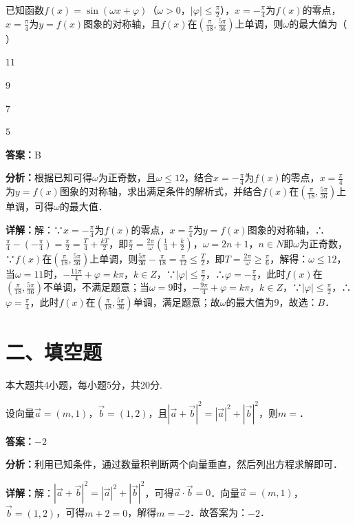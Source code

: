 \begin{question}[points=5]
已知函数$f(x)=\sin(\omega x+\varphi)$（$\omega>0$，$|\varphi|\le\frac{\pi}{2}$），$x=-\frac{\pi}{4}$为$f(x)$的零点，$x=\frac{\pi}{4}$为$y=f(x)$图象的对称轴，且$f(x)$在$(\frac{\pi}{18},\frac{5\pi}{36})$上单调，则$\omega$的最大值为（ ）
\begin{choices}
  \item $11$
  \item $9$
  \item $7$
  \item $5$
\end{choices}
\begin{solution}
\textbf{答案：}B

\textbf{分析：}根据已知可得$\omega$为正奇数，且$\omega\le12$，结合$x=-\frac{\pi}{4}$为$f(x)$的零点，$x=\frac{\pi}{4}$为$y=f(x)$图象的对称轴，求出满足条件的解析式，并结合$f(x)$在$(\frac{\pi}{18},\frac{5\pi}{36})$上单调，可得$\omega$的最大值．

\textbf{详解：}解：∵$x=-\frac{\pi}{4}$为$f(x)$的零点，$x=\frac{\pi}{4}$为$y=f(x)$图象的对称轴，∴$\frac{\pi}{4}-(-\frac{\pi}{4})=\frac{\pi}{2}=\frac{T}{4}+\frac{kT}{2}$，即$\frac{\pi}{2}=\frac{2\pi}{\omega}(\frac{1}{4}+\frac{k}{2})$，$\omega=2n+1$，$n\in N$即$\omega$为正奇数，∵$f(x)$在$(\frac{\pi}{18},\frac{5\pi}{36})$上单调，则$\frac{5\pi}{36}-\frac{\pi}{18}=\frac{\pi}{12}\le\frac{T}{2}$，即$T=\frac{2\pi}{\omega}\ge\frac{\pi}{6}$，解得：$\omega\le12$，当$\omega=11$时，$-\frac{11\pi}{4}+\varphi=k\pi$，$k\in Z$，∵$|\varphi|\le\frac{\pi}{2}$，∴$\varphi=-\frac{\pi}{4}$，此时$f(x)$在$(\frac{\pi}{18},\frac{5\pi}{36})$不单调，不满足题意；当$\omega=9$时，$-\frac{9\pi}{4}+\varphi=k\pi$，$k\in Z$，∵$|\varphi|\le\frac{\pi}{2}$，∴$\varphi=\frac{\pi}{4}$，此时$f(x)$在$(\frac{\pi}{18},\frac{5\pi}{36})$单调，满足题意；故$\omega$的最大值为$9$，故选：$B$．
\end{solution}
\end{question}

\section*{二、填空题}
本大题共4小题，每小题5分，共20分.

\begin{question}[points=5]
设向量$\vec{a}=(m,1)$，$\vec{b}=(1,2)$，且$|\vec{a}+\vec{b}|^2=|\vec{a}|^2+|\vec{b}|^2$，则$m=$．
\fillin[{$-2$}]
\begin{solution}
\textbf{答案：}$-2$

\textbf{分析：}利用已知条件，通过数量积判断两个向量垂直，然后列出方程求解即可．

\textbf{详解：}解：$|\vec{a}+\vec{b}|^2=|\vec{a}|^2+|\vec{b}|^2$，可得$\vec{a}\cdot\vec{b}=0$．向量$\vec{a}=(m,1)$，$\vec{b}=(1,2)$，可得$m+2=0$，解得$m=-2$．故答案为：$-2$．
\end{solution}
\end{question}

